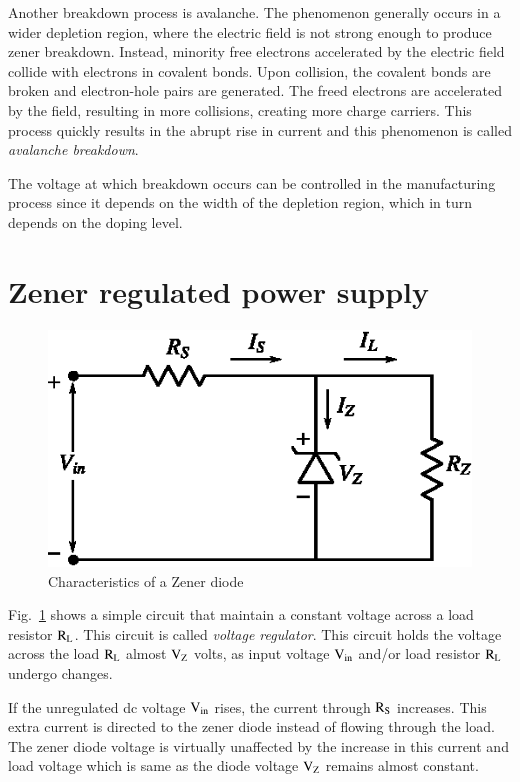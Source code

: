 Another breakdown process is avalanche. The phenomenon generally occurs in a wider depletion region, where the electric field is not strong enough to produce zener breakdown. Instead, minority free electrons accelerated by the electric field collide with electrons in covalent bonds. Upon collision, the covalent bonds are broken and electron-hole pairs are generated. The freed electrons are accelerated by the field, resulting in more collisions, creating more charge carriers. This process quickly results in the abrupt rise in current and this phenomenon is called {\em avalanche breakdown}.

The voltage at which breakdown occurs can be controlled in the manufacturing process since it depends on the width of the depletion region, which in turn depends on the doping level.

\section{Zener regulated power supply}\label{sec1.13}
\begin{figure}[H]
\centering
\includegraphics{chap1/fig1.46.eps}
\caption{Characteristics of a Zener diode}\label{fig1.46}
\end{figure}

Fig.~\ref{fig1.46} shows a simple circuit that maintain a constant voltage across a load resistor $\textrm{R}_{\textrm{L}}$. This circuit is called {\em voltage regulator}. This circuit holds the voltage across the load $\textrm{R}_{\textrm{L}}$ almost $\textrm{V}_{\textrm{Z}}$ volts, as input voltage $\textrm{V}_{\text{in}}$ and/or load resistor $\textrm{R}_{\textrm{L}}$ undergo changes.

If the unregulated dc voltage $\textrm{V}_{\text{in}}$ rises, the current through $\textrm{R}_{\textrm{S}}$ increases. This extra current is directed to the zener diode instead of flowing through the load. The zener diode voltage is virtually unaffected by the increase in this current and load voltage which is same as the diode voltage $\textrm{V}_{\textrm{Z}}$ remains almost constant.


